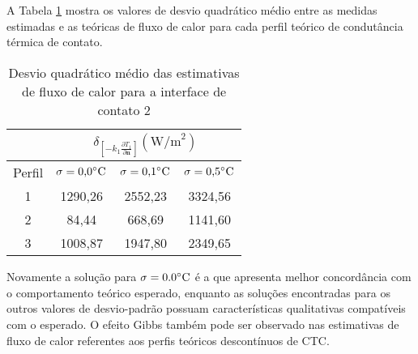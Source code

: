 A Tabela \ref{tabela_rms_fluxo_calor_interface_2} mostra os valores de desvio quadrático médio entre as medidas estimadas e as teóricas de fluxo de calor para cada perfil teórico de condutância térmica de contato.
\begin{table}[H]
	\centering
	\caption{Desvio quadrático médio das estimativas de fluxo de calor para a interface de contato 2}
	\begin{tabular}{c|c|c|c|}
		\cline{2-4}
		& \multicolumn{3}{c|}{$\delta_{\left[-k_1 \frac{\partial T_1}{\partial \mathbf{n}}\right]}(\text{W/m}^2)$} \\ \hline
		\multicolumn{1}{|c|}{Perfil} & $\sigma = \text{0,0}\celsius$   & $\sigma = \text{0,1}\celsius$    & $\sigma = \text{0,5}\celsius$  \\ \hline
		\multicolumn{1}{|c|}{1}      & 1290,26          &  2552,23      &  3324,56      \\ \hline
		\multicolumn{1}{|c|}{2}      & 84,44       & 668,69       & 1141,60      \\ \hline
		\multicolumn{1}{|c|}{3}      & 1008,87       & 1947,80       & 2349,65      \\ \hline
	\end{tabular}
	\label{tabela_rms_fluxo_calor_interface_2}
\end{table}

Novamente a solução para $\sigma = 0.0\celsius$ é a que apresenta melhor concordância com o comportamento teórico esperado, enquanto as soluções encontradas para os outros valores de desvio-padrão possuam características qualitativas compatíveis com o esperado. O efeito Gibbs também pode ser observado nas estimativas de fluxo de calor referentes aos perfis teóricos descontínuos de CTC.

%
%

